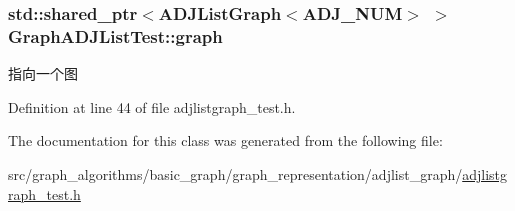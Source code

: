 \subsubsection[{graph}]{\setlength{\rightskip}{0pt plus 5cm}std\+::shared\+\_\+ptr$<${\bf A\+D\+J\+List\+Graph}$<$A\+D\+J\+\_\+\+N\+U\+M$>$ $>$ Graph\+A\+D\+J\+List\+Test\+::graph\hspace{0.3cm}{\ttfamily [protected]}}\label{class_graph_a_d_j_list_test_afcd2f035a4957685bc697f296bb2b4b5}
指向一个图 

Definition at line 44 of file adjlistgraph\+\_\+test.\+h.



The documentation for this class was generated from the following file\+:\begin{DoxyCompactItemize}
\item 
src/graph\+\_\+algorithms/basic\+\_\+graph/graph\+\_\+representation/adjlist\+\_\+graph/\hyperlink{adjlistgraph__test_8h}{adjlistgraph\+\_\+test.\+h}\end{DoxyCompactItemize}
